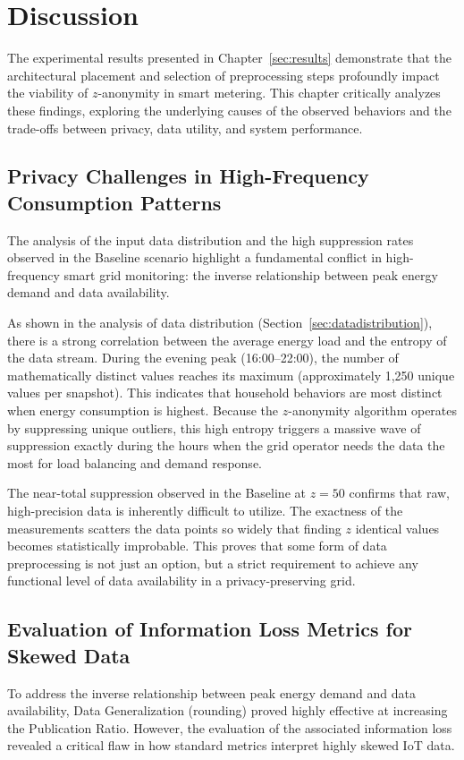 \chapter{Discussion}
\label{ch:discussion}

The experimental results presented in Chapter~\ref{sec:results} demonstrate that the architectural placement and selection of preprocessing steps profoundly impact the viability of $z$-anonymity in smart metering. This chapter critically analyzes these findings, exploring the underlying causes of the observed behaviors and the trade-offs between privacy, data utility, and system performance.

\section{Privacy Challenges in High-Frequency Consumption Patterns}
The analysis of the input data distribution and the high suppression rates observed in the Baseline scenario highlight a fundamental conflict in high-frequency smart grid monitoring: the inverse relationship between peak energy demand and data availability. 

As shown in the analysis of data distribution (Section~\ref{sec:datadistribution}), there is a strong correlation between the average energy load and the entropy of the data stream. During the evening peak (16:00--22:00), the number of mathematically distinct values reaches its maximum (approximately 1,250 unique values per snapshot). This indicates that household behaviors are most distinct when energy consumption is highest. Because the $z$-anonymity algorithm operates by suppressing unique outliers, this high entropy triggers a massive wave of suppression exactly during the hours when the grid operator needs the data the most for load balancing and demand response. 

The near-total suppression observed in the Baseline at $z=50$ confirms that raw, high-precision data is inherently difficult to utilize. The exactness of the measurements scatters the data points so widely that finding $z$ identical values becomes statistically improbable. This proves that some form of data preprocessing is not just an option, but a strict requirement to achieve any functional level of data availability in a privacy-preserving grid.

\section{Evaluation of Information Loss Metrics for Skewed Data}
To address the inverse relationship between peak energy demand and data availability, Data Generalization (rounding) proved highly effective at increasing the Publication Ratio. However, the evaluation of the associated information loss revealed a critical flaw in how standard metrics interpret highly skewed IoT data.

